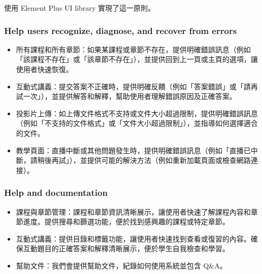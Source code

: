 \documentclass[12pt]{article}
\begin{document}
使用 Element Plus UI library 實現了這一原則。

\subsubsection{Help users recognize, diagnose, and recover from errors}

\begin{itemize}
  \item 所有課程和所有章節：如果某課程或章節不存在，提供明確錯誤訊息（例如「該課程不存在」或「該章節不存在」），並提供回到上一頁或主頁的選項，讓使用者快速恢復。
  \item 互動式講義：提交答案不正確時，提供明確反饋（例如「答案錯誤」或「請再試一次」），並提供解答和解釋，幫助使用者理解錯誤原因及正確答案。
  \item 投影片上傳：如上傳文件格式不支持或文件大小超過限制，提供明確錯誤訊息（例如「不支持的文件格式」或「文件大小超過限制」），並指導如何選擇適合的文件。
  \item 教學頁面：直播中斷或其他問題發生時，提供明確錯誤訊息（例如「直播已中斷，請稍後再試」），並提供可能的解決方法（例如重新加載頁面或檢查網路連接）。
\end{itemize}

\subsubsection{Help and documentation}

\begin{itemize}
  \item 課程與章節管理：課程和章節資訊清晰展示，讓使用者快速了解課程內容和章節進度。提供搜尋和篩選功能，便於找到感興趣的課程或特定章節。
  \item 互動式講義：提供目錄和標籤功能，讓使用者快速找到查看或復習的內容。確保互動題目的正確答案和解釋清晰展示，便於學生自我檢查和學習。
  \item 幫助文件：我們會提供幫助文件，紀錄如何使用系統並包含 Q\&A。
\end{itemize}
\end{document}

